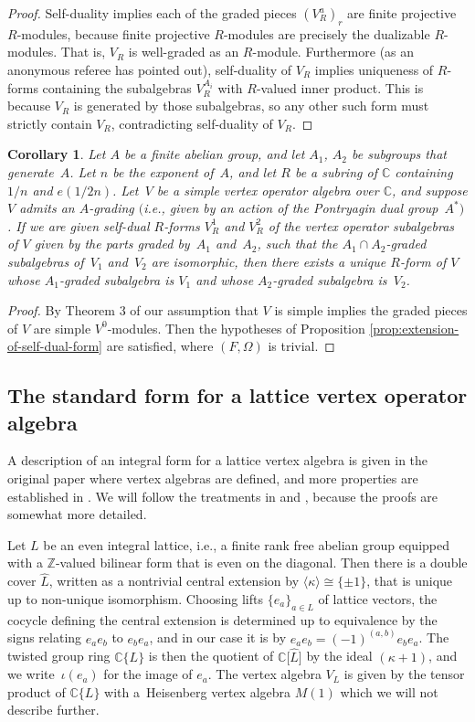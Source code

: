 \documentclass[11pt]{article}
\newcommand{\bC}{\mathbb{C}}
\newcommand{\bZ}{\mathbb{Z}}
\newtheorem{cor}[thm]{Corollary}
\theoremstyle{definition}
\begin{document}
\begin{proof}
Self-duality implies each of the graded pieces $(V^a_R)_r$ are finite projective $R$-modules, because finite projective $R$-modules are precisely the dualizable $R$-modules. That is, $V_R$ is well-graded as an $R$-module. Furthermore (as an anonymous referee has pointed out), self-duality of $V_R$ implies uniqueness of $R$-forms containing the subalgebras $V^{A_i}_R$ with $R$-valued inner product. This is because $V_R$ is generated by those subalgebras, so any other such form must strictly contain $V_R$, contradicting self-duality of $V_R$.
\end{proof}

\begin{cor} \label{cor:voa-generated-by-subvoas}Let $A$ be a finite abelian group, and let $A_1$, $A_2$ be subgroups that generate~$A$. Let $n$ be the exponent of~$A$, and let $R$ be a subring of $\bC$ containing $1/n$ and $e(1/2n)$. Let~$V$ be a simple vertex operator algebra over $\bC$, and suppose $V$ admits an $A$-grading $($i.e., given by an action of the Pontryagin dual group~$A^*)$. If we are given self-dual $R$-forms $V_R^1$ and $V_R^2$ of the vertex operator subalgebras of $V$ given by the parts graded by~$A_1$ and~$A_2$, such that the $A_1 \cap A_2$-graded subalgebras of~$V_1$ and~$V_2$ are isomorphic, then there exists a unique $R$-form of $V$ whose $A_1$-graded subalgebra is $V_1$ and whose $A_2$-graded subalgebra is~$V_2$.
\end{cor}
\begin{proof}
By Theorem 3 of \cite{DM94a} our assumption that $V$ is simple implies the graded pieces of $V$ are simple $V^0$-modules. Then the hypotheses of Proposition \ref{prop:extension-of-self-dual-form} are satisfied, where $(F,\Omega)$ is trivial.
\end{proof}

\subsection{The standard form for a lattice vertex operator algebra}

A description of an integral form for a lattice vertex algebra is given in the original paper \cite{B86} where vertex algebras are defined, and more properties are established in \cite{B99}. We will follow the treatments in \cite{DG12} and \cite{M14}, because the proofs are somewhat more detailed.

Let $L$ be an even integral lattice, i.e., a finite rank free abelian group equipped with a $\bZ$-valued bilinear form that is even on the diagonal. Then there is a double cover $\hat{L}$, written as a nontrivial central extension by $ \langle \kappa \rangle \cong \{\pm 1\}$, that is unique up to non-unique isomorphism. Choosing lifts $\{ e_a \}_{a\in L}$ of lattice vectors, the cocycle defining the central extension is determined up to equivalence by the signs relating $e_a e_b$ to $e_b e_a$, and in our case it is by $e_a e_b = (-1)^{(a,b)} e_b e_a$. The twisted group ring $\bC\{L\}$ is then the quotient of $\bC\big[\hat{L}\big]$ by the ideal $(\kappa + 1)$, and we write~$\iota(e_a)$ for the image of $e_a$. The vertex algebra $V_L$ is given by the tensor product of $\bC\{L\}$ with a~Heisenberg vertex algebra $M(1)$ which we will not describe further.
\end{document}
